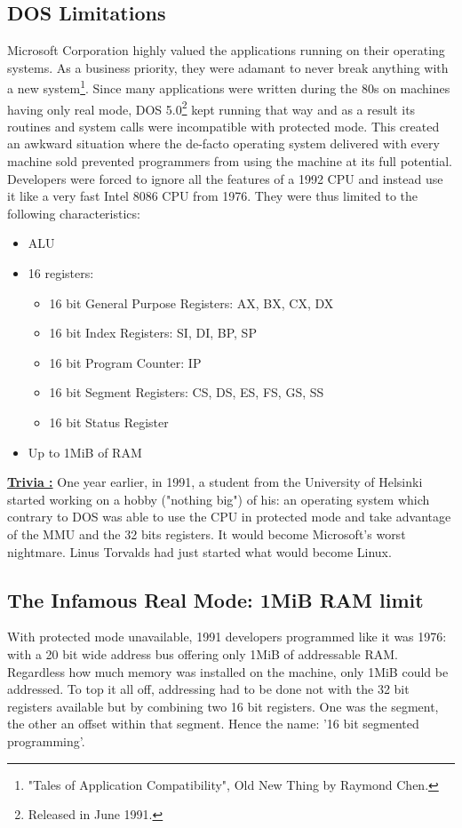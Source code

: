 \documentclass[book.tex]{subfiles}
\begin{document}
  \subsection{DOS Limitations}
  Microsoft Corporation highly valued the applications running on their operating systems. As a business priority, they were adamant to never break anything with a new system\footnote{"Tales of Application Compatibility", Old New Thing by Raymond Chen.}.  Since many applications were written during the 80s on machines having only real mode, DOS 5.0\footnote{Released in June 1991.} kept running that way and as a result its routines and system calls were incompatible with protected mode. This created an awkward situation where the de-facto operating system delivered with every machine sold prevented programmers from using the machine at its full potential. Developers were forced to ignore all the features of a 1992 CPU and instead use it like a very fast Intel 8086 CPU from 1976. They were thus limited to the following characteristics:
\begin{itemize}
\item ALU
\item 16 registers:
\begin{itemize}
  \item 16 bit General Purpose Registers: AX, BX, CX, DX
  \item 16 bit Index Registers: SI, DI, BP, SP
  \item 16 bit Program Counter: IP
  \item 16 bit Segment Registers: CS, DS, ES, FS, GS, SS
  \item 16 bit Status Register
\end{itemize}
\item Up to 1MiB of RAM
\end{itemize}


\bigskip

 \textbf{\underline{Trivia :}} One year earlier, in 1991, a student from the University of Helsinki started working on a hobby ("nothing big") of his: an operating system which contrary to DOS was able to use the CPU in protected mode and take advantage of the MMU and the 32 bits registers. It would become Microsoft's worst nightmare. Linus Torvalds had just started what would become Linux.



  \subsection{The Infamous Real Mode: 1MiB RAM limit}
  With protected mode unavailable, 1991 developers programmed like it was 1976: with a 20 bit wide address bus offering only 1MiB of addressable RAM. Regardless how much memory was installed on the machine, only 1MiB could be addressed. To top it all off, addressing had to be done not with the 32 bit registers available but by combining two 16 bit registers. One was the segment, the other an offset within that segment. Hence the name: '16 bit segmented programming'.
\end{document}
